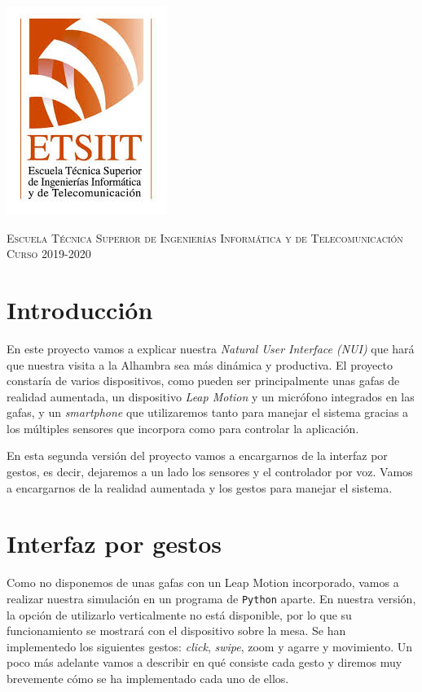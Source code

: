 \documentclass[11pt,a4paper]{article}
\begin{document}
\begin{titlepage}
\begin{minipage}{\textwidth}
\includegraphics[scale=0.3]{img/etsiit.jpeg}

\vspace{0.5cm}
\textsc{Escuela Técnica Superior de Ingenierías Informática y de Telecomunicación}\\
\vspace{0.5cm}
\textsc{Curso 2019-2020}
\end{minipage}
\end{titlepage}

\tableofcontents
\thispagestyle{empty}				%

\newpage

\setlength{\parskip}{1em}


\section{Introducción}
En este proyecto vamos a explicar nuestra \textit{Natural User Interface (NUI)} que hará que nuestra visita a la Alhambra sea más
dinámica y productiva. El proyecto constaría de varios dispositivos, como pueden ser principalmente unas gafas de realidad aumentada,
un dispositivo \textit{Leap Motion} y un micrófono integrados en las gafas, y un \textit{smartphone} que utilizaremos tanto para
manejar el sistema gracias a los múltiples sensores que incorpora como para controlar la aplicación.

En esta segunda versión del proyecto vamos a encargarnos de la interfaz por gestos, es decir, dejaremos a un lado los sensores
y el controlador por voz. Vamos a encargarnos de la realidad aumentada y los gestos para manejar el sistema.

\section{Interfaz por gestos}
Como no disponemos de unas gafas con un Leap Motion incorporado, vamos a realizar nuestra simulación en un programa de \texttt{Python} aparte. En
nuestra versión, la opción de utilizarlo verticalmente no está disponible, por lo que su funcionamiento se mostrará con el dispositivo
sobre la mesa. Se han implementedo los siguientes gestos: \textit{click}, \textit{swipe}, zoom y agarre y movimiento. Un
poco más adelante vamos a describir en qué consiste cada gesto y diremos muy brevemente cómo se ha
implementado cada uno de ellos.
\end{document}
